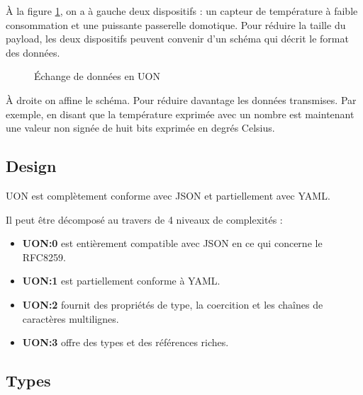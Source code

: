 \documentclass[
    iict, %
    il, %
]{heig-tb}
\begin{document}
\vspace{\parskip}

À la figure \ref*{data-exchange}, on a à gauche deux dispositifs : un capteur de température à faible consommation
et une puissante passerelle domotique. Pour réduire la taille du payload, les deux dispositifs peuvent convenir d'un schéma qui décrit le format des données.

\begin{figure}[H]
    \begin{center}
    \end{center}
    \caption[Échange de données en UON]{\label{data-exchange}Échange de données en UON}
\end{figure}

À droite on affine le schéma. Pour réduire davantage les données transmises.
Par exemple, en disant que la température exprimée avec un nombre est maintenant une valeur non signée de huit bits exprimée en degrés Celsius.

\subsection{Design}
UON est complètement conforme avec JSON et partiellement avec YAML.

Il peut être décomposé au travers de 4 niveaux de complexités :
\begin{itemize}
    \item \textbf{UON:0} est entièrement compatible avec JSON en ce qui concerne le RFC8259.
    \item \textbf{UON:1} est partiellement conforme à YAML.
    \item \textbf{UON:2} fournit des propriétés de type, la coercition et les chaînes de caractères multilignes.
    \item \textbf{UON:3} offre des types et des références riches.
\end{itemize}

\subsection{Types}
\end{document}
